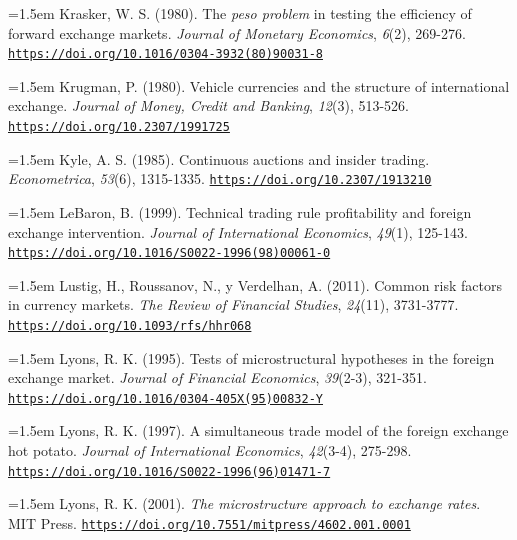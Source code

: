 \documentclass[10pt,a4paper]{article}
\begin{document}
\noindent\hangindent=1.5em Krasker, W. S. (1980). The \textit{peso problem} in testing the efficiency of forward exchange markets. \textit{Journal of Monetary Economics}, \textit{6}(2), 269-276. \href{https://doi.org/10.1016/0304-3932(80)90031-8}{\nolinkurl{https://doi.org/10.1016/0304-3932(80)90031-8}}

\noindent\hangindent=1.5em Krugman, P. (1980). Vehicle currencies and the structure of international exchange. \textit{Journal of Money, Credit and Banking}, \textit{12}(3), 513-526. \href{https://doi.org/10.2307/1991725}{\nolinkurl{https://doi.org/10.2307/1991725}}

{\sloppy\noindent\hangindent=1.5em Kyle, A. S. (1985). Continuous auctions and insider trading. \textit{Econometrica}, \textit{53}(6), 1315-1335. \href{https://doi.org/10.2307/1913210}{\nolinkurl{https://doi.org/10.2307/1913210}}\par}

\noindent\hangindent=1.5em LeBaron, B. (1999). Technical trading rule profitability and foreign exchange intervention. \textit{Journal of International Economics}, \textit{49}(1), 125-143. \href{https://doi.org/10.1016/S0022-1996(98)00061-0}{\nolinkurl{https://doi.org/10.1016/S0022-1996(98)00061-0}}

\noindent\hangindent=1.5em Lustig, H., Roussanov, N., y Verdelhan, A. (2011). Common risk factors in currency markets. \textit{The Review of Financial Studies}, \textit{24}(11), 3731-3777. \href{https://doi.org/10.1093/rfs/hhr068}{\nolinkurl{https://doi.org/10.1093/rfs/hhr068}}

\noindent\hangindent=1.5em Lyons, R. K. (1995). Tests of microstructural hypotheses in the foreign exchange market. \textit{Journal of Financial Economics}, \textit{39}(2-3), 321-351. \href{https://doi.org/10.1016/0304-405X(95)00832-Y}{\nolinkurl{https://doi.org/10.1016/0304-405X(95)00832-Y}}

\noindent\hangindent=1.5em Lyons, R. K. (1997). A simultaneous trade model of the foreign exchange hot potato. \textit{Journal of International Economics}, \textit{42}(3-4), 275-298. \href{https://doi.org/10.1016/S0022-1996(96)01471-7}{\nolinkurl{https://doi.org/10.1016/S0022-1996(96)01471-7}}

{\sloppy\noindent\hangindent=1.5em Lyons, R. K. (2001). \textit{The microstructure approach to exchange rates}. MIT Press. \href{https://doi.org/10.7551/mitpress/4602.001.0001}{\nolinkurl{https://doi.org/10.7551/mitpress/4602.001.0001}}\par}
\end{document}
